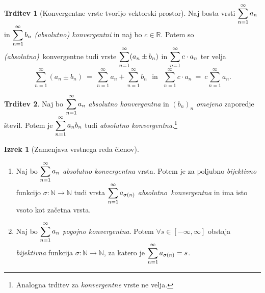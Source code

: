\documentclass[11pt]{article}
\newcommand{\R}{\mathbb{R}}
\newcommand{\N}{\mathbb{N}}
\theoremstyle{definition}
\theoremstyle{definition}
\newtheorem{trditev}{Trditev}[section]
\theoremstyle{definition}
\newtheorem{izrek}{Izrek}[section]
\theoremstyle{theorem}
\begin{document}
\begin{trditev}[Konvergentne vrste tvorijo vektorski prostor]

Naj bosta \hbox{vrsti} $\mathlarger{\sum_{n=1}^\infty a_n}$ in $\mathlarger{\sum_{n=1}^\infty b_n}$ \textit{(absolutno) konvergentni} in naj bo $c \in \R$. Potem so \hbox{\textit{(absolutno)} konvergentne} tudi vrste $\mathlarger{\sum_{n=1}^\infty (a_n \pm b_n)}$ in $\mathlarger{\sum_{n=1}^\infty c \cdot a_n}$ ter velja
$$\sum_{n=1}^\infty (a_n \pm b_n) ~=~ \sum_{n=1}^\infty a_n + \sum_{n=1}^\infty b_n ~~~\text{in}~~~ \sum_{n=1}^\infty c \cdot a_n ~=~ c \sum_{n=1}^\infty a_n.$$

\end{trditev}
\vspace{0.5cm}

\begin{trditev}

Naj bo $\mathlarger{\sum_{n=1}^\infty a_n}$ \textit{absolutno konvergentna} in $(b_n)_n$ \textit{omejeno} \hbox{zaporedje} števil.  Potem je $\mathlarger{\sum_{n=1}^\infty a_n b_n}$ tudi \textit{absolutno konvergentna}.\footnote{Analogna trditev za \textit{konvergentne} vrste ne velja.}

\end{trditev}
\vspace{0.5cm}

\begin{izrek}[Zamenjava vrstnega reda členov]
~
\begin{enumerate}

\item[(1)] Naj bo $\mathlarger{\sum_{n=1}^\infty a_n}$ \textit{absolutno konvergentna} vrsta. Potem je za poljubno \hbox{\textit{bijektivno}} funkcijo $\sigma: \N \rightarrow \N$ tudi vrsta $\mathlarger{\sum_{n=1}^\infty a_{\sigma(n)}}$ \hbox{\textit{absolutno konvergentna}} in ima isto vsoto kot začetna vrsta.

\item[(2)] Naj bo $\mathlarger{\sum_{n=1}^\infty a_n}$ \textit{pogojno konvergentna}. Potem $\forall s \in [-\infty, \infty]$ obstaja \textit{bijektivna} funkcija $\sigma: \N \rightarrow \N$, za katero je $\mathlarger{\sum_{n=1}^\infty a_{\sigma(n)}} = s$.

\end{enumerate}

\end{izrek}
\vspace{0.5cm}

\end{document}
